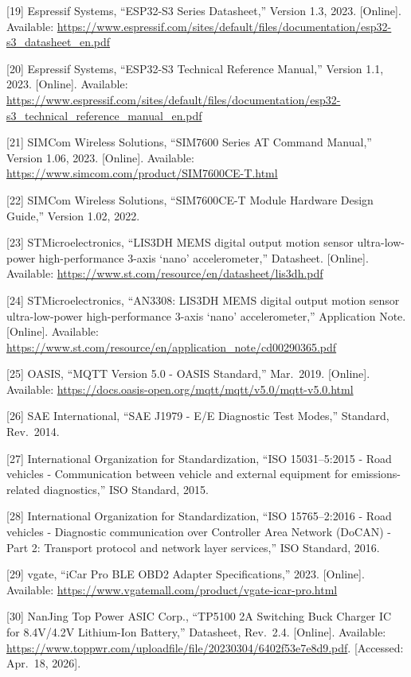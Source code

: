 \documentclass[a4paper]{extarticle}
\begin{document}
{[}19{]} Espressif Systems, ``ESP32-S3 Series Datasheet,'' Version 1.3, 2023. {[}Online{]}. Available:
\url{https://www.espressif.com/sites/default/files/documentation/esp32-s3_datasheet_en.pdf}

{[}20{]} Espressif Systems, ``ESP32-S3 Technical Reference Manual,'' Version
1.1, 2023. {[}Online{]}. Available:
\url{https://www.espressif.com/sites/default/files/documentation/esp32-s3_technical_reference_manual_en.pdf}

{[}21{]} SIMCom Wireless Solutions, ``SIM7600 Series AT Command Manual,''
Version 1.06, 2023. {[}Online{]}. Available:
\url{https://www.simcom.com/product/SIM7600CE-T.html}

{[}22{]} SIMCom Wireless Solutions, ``SIM7600CE-T Module Hardware Design
Guide,'' Version 1.02, 2022.

{[}23{]} STMicroelectronics, ``LIS3DH MEMS digital output motion sensor
ultra-low-power high-performance 3-axis `nano' accelerometer,'' Datasheet.
{[}Online{]}. Available:
\url{https://www.st.com/resource/en/datasheet/lis3dh.pdf}

{[}24{]} STMicroelectronics, ``AN3308: LIS3DH MEMS digital output motion
sensor ultra-low-power high-performance 3-axis `nano' accelerometer,''
Application Note. {[}Online{]}. Available:
\url{https://www.st.com/resource/en/application_note/cd00290365.pdf}

{[}25{]} OASIS, ``MQTT Version 5.0 - OASIS Standard,'' Mar.~2019.
{[}Online{]}. Available:
\url{https://docs.oasis-open.org/mqtt/mqtt/v5.0/mqtt-v5.0.html}

{[}26{]} SAE International, ``SAE J1979 - E/E Diagnostic Test Modes,''
Standard, Rev.~2014.

{[}27{]} International Organization for Standardization, ``ISO
15031--5:2015 - Road vehicles - Communication between vehicle and
external equipment for emissions-related diagnostics,'' ISO Standard, 2015.

{[}28{]} International Organization for Standardization, ``ISO
15765--2:2016 - Road vehicles - Diagnostic communication over Controller
Area Network (DoCAN) - Part 2: Transport protocol and network layer
services,'' ISO Standard, 2016.

{[}29{]} vgate, ``iCar Pro BLE OBD2 Adapter Specifications,'' 2023.
{[}Online{]}. Available:
\url{https://www.vgatemall.com/product/vgate-icar-pro.html}

{[}30{]} NanJing Top Power ASIC Corp., ``TP5100 2A Switching Buck Charger
IC for 8.4V/4.2V Lithium-Ion Battery,'' Datasheet, Rev.~2.4. {[}Online{]}.
Available:
\url{https://www.toppwr.com/uploadfile/file/20230304/6402f53e7e8d9.pdf}.
{[}Accessed: Apr.~18, 2026{]}.
\end{document}

